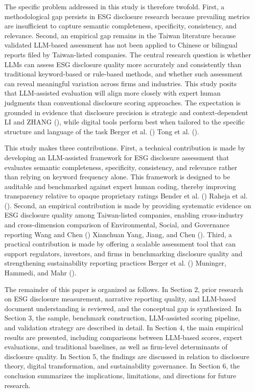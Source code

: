 \documentclass[
  12pt,
]{article}
\begin{document}
The specific problem addressed in this study is therefore twofold.
First, a methodological gap persists in ESG disclosure research because
prevailing metrics are insufficient to capture semantic completeness,
specificity, consistency, and relevance. Second, an empirical gap
remains in the Taiwan literature because validated LLM-based assessment
has not been applied to Chinese or bilingual reports filed by
Taiwan-listed companies. The central research question is whether LLMs
can assess ESG disclosure quality more accurately and consistently than
traditional keyword-based or rule-based methods, and whether such
assessment can reveal meaningful variation across firms and industries.
This study posits that LLM-assisted evaluation will align more closely
with expert human judgments than conventional disclosure scoring
approaches. The expectation is grounded in evidence that disclosure
precision is strategic and context-dependent LI and ZHANG
(), while digital tools perform best when
tailored to the specific structure and language of the task Berger et
al. () Tong et al.
().

This study makes three contributions. First, a technical contribution is
made by developing an LLM-assisted framework for ESG disclosure
assessment that evaluates semantic completeness, specificity,
consistency, and relevance rather than relying on keyword frequency
alone. This framework is designed to be auditable and benchmarked
against expert human coding, thereby improving transparency relative to
opaque proprietary ratings Bender et al.
() Raheja et al.
(). Second, an empirical contribution is
made by providing systematic evidence on ESG disclosure quality among
Taiwan-listed companies, enabling cross-industry and cross-dimension
comparison of Environmental, Social, and Governance reporting Wang and
Chen () Xianchuan Yang, Jiang, and Chen
(). Third, a practical contribution is made
by offering a scalable assessment tool that can support regulators,
investors, and firms in benchmarking disclosure quality and
strengthening sustainability reporting practices Berger et al.
() Muninger, Hammedi, and Mahr
().

The remainder of this paper is organized as follows. In Section 2, prior
research on ESG disclosure measurement, narrative reporting quality, and
LLM-based document understanding is reviewed, and the conceptual gap is
synthesized. In Section 3, the sample, benchmark construction,
LLM-assisted scoring pipeline, and validation strategy are described in
detail. In Section 4, the main empirical results are presented,
including comparisons between LLM-based scores, expert evaluations, and
traditional baselines, as well as firm-level determinants of disclosure
quality. In Section 5, the findings are discussed in relation to
disclosure theory, digital transformation, and sustainability
governance. In Section 6, the conclusion summarizes the implications,
limitations, and directions for future research.
\end{document}
